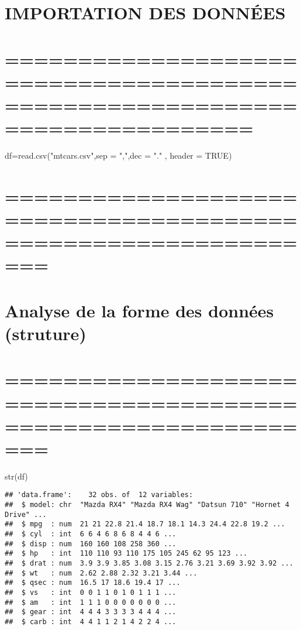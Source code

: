 \documentclass[
]{article}
\newenvironment{Shaded}{\begin{snugshade}}{\end{snugshade}}
\newcommand{\AttributeTok}[1]{\textcolor[rgb]{0.77,0.63,0.00}{#1}}
\newcommand{\ConstantTok}[1]{\textcolor[rgb]{0.00,0.00,0.00}{#1}}
\newcommand{\FunctionTok}[1]{\textcolor[rgb]{0.00,0.00,0.00}{#1}}
\newcommand{\NormalTok}[1]{#1}
\newcommand{\OtherTok}[1]{\textcolor[rgb]{0.56,0.35,0.01}{#1}}
\newcommand{\StringTok}[1]{\textcolor[rgb]{0.31,0.60,0.02}{#1}}
\begin{document}
\hypertarget{importation-des-donnuxe9es}{%
\section{IMPORTATION DES DONNÉES}\label{importation-des-donnuxe9es}}

\hypertarget{section-5}{%
\section{=============================================================================}\label{section-5}}

\begin{Shaded}
\begin{Highlighting}[]
\NormalTok{df}\OtherTok{=}\FunctionTok{read.csv}\NormalTok{(}\StringTok{"mtcars.csv"}\NormalTok{,}\AttributeTok{sep =} \StringTok{","}\NormalTok{,}\AttributeTok{dec =} \StringTok{"."}\NormalTok{ , }\AttributeTok{header =} \ConstantTok{TRUE}\NormalTok{)}
\end{Highlighting}
\end{Shaded}

\hypertarget{section-6}{%
\section{===============================================================}\label{section-6}}

\hypertarget{analyse-de-la-forme-des-donnuxe9es-struture}{%
\section{Analyse de la forme des données
(struture)}\label{analyse-de-la-forme-des-donnuxe9es-struture}}

\hypertarget{section-7}{%
\section{===============================================================}\label{section-7}}

\begin{Shaded}
\begin{Highlighting}[]
\FunctionTok{str}\NormalTok{(df)}
\end{Highlighting}
\end{Shaded}

\begin{verbatim}
## 'data.frame':    32 obs. of  12 variables:
##  $ model: chr  "Mazda RX4" "Mazda RX4 Wag" "Datsun 710" "Hornet 4 Drive" ...
##  $ mpg  : num  21 21 22.8 21.4 18.7 18.1 14.3 24.4 22.8 19.2 ...
##  $ cyl  : int  6 6 4 6 8 6 8 4 4 6 ...
##  $ disp : num  160 160 108 258 360 ...
##  $ hp   : int  110 110 93 110 175 105 245 62 95 123 ...
##  $ drat : num  3.9 3.9 3.85 3.08 3.15 2.76 3.21 3.69 3.92 3.92 ...
##  $ wt   : num  2.62 2.88 2.32 3.21 3.44 ...
##  $ qsec : num  16.5 17 18.6 19.4 17 ...
##  $ vs   : int  0 0 1 1 0 1 0 1 1 1 ...
##  $ am   : int  1 1 1 0 0 0 0 0 0 0 ...
##  $ gear : int  4 4 4 3 3 3 3 4 4 4 ...
##  $ carb : int  4 4 1 1 2 1 4 2 2 4 ...
\end{verbatim}
\end{document}
